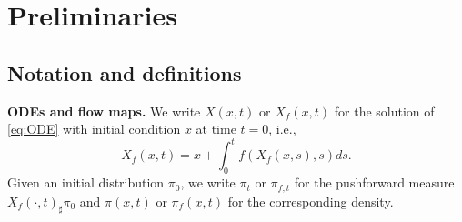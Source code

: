 \newcommand{\co}{[0,1]}
\newcommand{\ci}{[0,1]^i}
\newcommand{\cd}{[0,1]^d}
\newcommand{\essinf}{{\rm ess\,inf}}
\newcommand{\supp}{{\rm supp}}
\tableofcontents

  

\section{Preliminaries}
\subsection{Notation and definitions}
 {\bf ODEs and flow maps.}
 We write $X(x,t)$ or $X_f(x,t)$ for the solution of \eqref{eq:ODE}
 with initial condition $x$ at time $t=0$, i.e.,
  \begin{equation}\label{eq:flowmap}
    X_f(x,t) = x + \int_0^tf(X_f(x,s),s)ds.
  \end{equation}
  Given an initial distribution $\pi_0$, we write $\pi_t$
  or $\pi_{f,t}$ for the 
  pushforward measure $X_f(\cdot,t)_\sharp \pi_0$ and $\pi(x,t)$ or $\pi_{f}(x,t)$ for the corresponding density. 

\medskip


